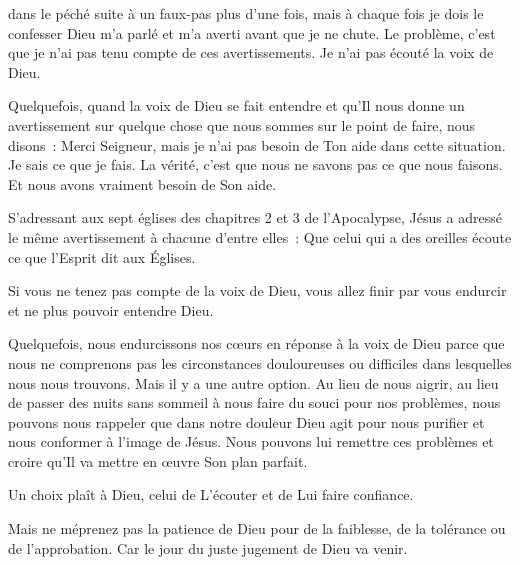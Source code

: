 




 dans le péché suite à un faux-pas
 plus d'une fois, mais à chaque fois \ocadr je dois le confesser \fcadr{}
 Dieu m'a parlé et m'a averti avant que je ne chute.
 Le problème, c'est que je n'ai pas tenu compte de ces avertissements.
 Je n'ai pas écouté la voix de Dieu. 

Quelquefois, quand la voix de Dieu se fait entendre et qu'Il nous donne
 un avertissement sur quelque chose que nous sommes sur le point de faire,
 nous disons~:
 \og Merci Seigneur, mais je n'ai pas besoin de Ton aide dans cette situation.
 Je sais ce que je fais. \fg{}
 La vérité, c'est que nous ne savons pas ce que nous faisons.
 Et nous avons vraiment besoin de Son aide. 

S'adressant aux sept églises des chapitres 2 et 3 de l'Apocalypse,
 Jésus a adressé le même avertissement à chacune d'entre elles~:
 \og Que celui qui a des oreilles écoute
 ce que l'Esprit dit aux Églises. \fg{}


Si vous ne tenez pas compte de la voix de Dieu,
 vous allez finir par vous endurcir et ne plus pouvoir entendre Dieu.

Quelquefois, nous endurcissons nos cœurs en réponse à la voix de Dieu
 parce que nous ne comprenons pas les circonstances douloureuses ou difficiles
 dans lesquelles nous nous trouvons.
 Mais il y a une autre option. Au lieu de nous aigrir,
 au lieu de passer des nuits sans sommeil à nous faire du souci
 pour nos problèmes, nous pouvons nous rappeler que dans notre douleur Dieu
 agit pour nous purifier et nous conformer à l'image de Jésus.
 Nous pouvons lui remettre ces problèmes et croire qu'Il va mettre
 en œuvre Son plan parfait. 

Un choix plaît à Dieu, celui de L'écouter et de Lui faire confiance. 

Mais ne méprenez pas la patience de Dieu pour de la faiblesse,
 de la tolérance ou de l'approbation.
 Car le jour du juste jugement de Dieu va venir.

\dvrule



